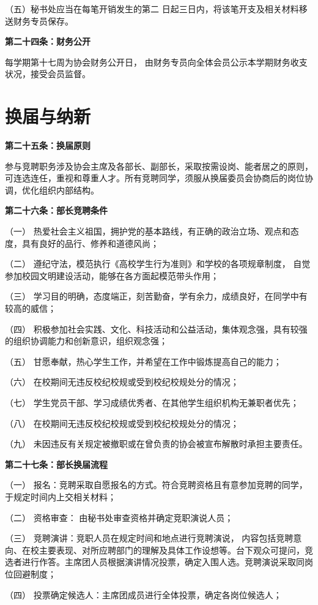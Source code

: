 \documentclass{mjsart}
\begin{document}
（五）秘书处应当在每笔开销发生的第二 日起三日内，将该笔开支及相关材料移送财务专员保存。

\textbf{第二十四条：财务公开}

每学期第十七周为协会财务公开日， 由财务专员向全体会员公示本学期财务收支状况，接受会员监督。

\section{换届与纳新}

\textbf{第二十五条：换届原则}

参与竞聘职务涉及协会主席及各部长、副部长，采取按需设岗、能者居之的原则，可连选连任，重视和尊重人才。所有竞聘同学，须服从换届委员会协商后的岗位协调，优化组织内部结构。

\textbf{第二十六条：部长竞聘条件}

（一） 热爱社会主义祖国，拥护党的基本路线，有正确的政治立场、观点和态度，具有良好的品行、修养和道德风尚；

（二） 遵纪守法，模范执行《高校学生行为准则》和学校的各项规章制度， 自觉参加校园文明建设活动，能够在各方面起模范带头作用；

（三） 学习目的明确，态度端正，刻苦勤奋，学有余力，成绩良好，在同学中有较高的威信；

（四） 积极参加社会实践、文化、科技活动和公益活动，集体观念强，具有较强的组织协调能力和创新意识，组织观念强；

（五） 甘愿奉献，热心学生工作，并希望在工作中锻炼提高自己的能力；

（六） 在校期间无违反校纪校规或受到校纪校规处分的情况；

（七） 学生党员干部、学习成绩优秀者、在其他学生组织机构无兼职者优先；

（八） 在校期间无违反校纪校规或受到校纪校规处分的情况；

（九） 未因违反有关规定被撤职或在曾负责的协会被宣布解散时承担主要责任。

\textbf{第二十七条：部长换届流程}

（一） 报名：竞聘采取自愿报名的方式。符合竞聘资格且有意参加竞聘的同学，于规定时间内上交相关材料；

（二） 资格审查： 由秘书处审查资格并确定竞职演说人员；

（三） 竞聘演讲：竞职人员在规定时间和地点进行竞聘演说， 内容包括竞聘意向、在校主要表现、对所应聘部门的理解及具体工作设想等。台下观众可提问，竞选者进行作答。主席团人员根据演讲情况投票，确定入围人选。竞聘演说采取同岗位回避制度；

（四） 投票确定候选人：主席团成员进行全体投票，确定各岗位候选人；
\end{document}
